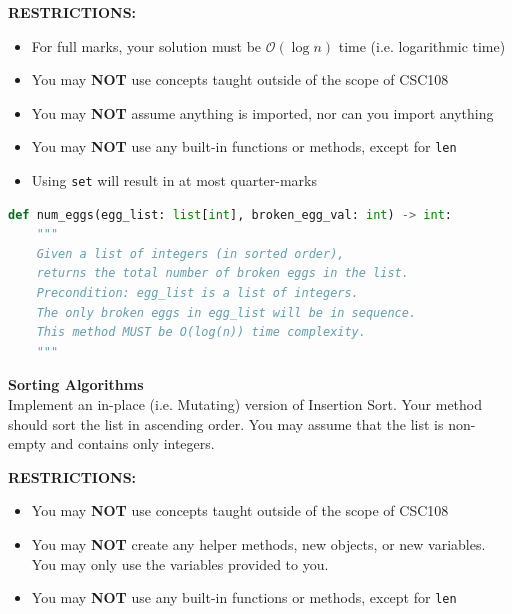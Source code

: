 \documentclass[letterpaper,13pt,addpoints]{exam}
\begin{document}
\begin{questions}
    \begin{center}
        \textbf{RESTRICTIONS:}
        \begin{itemize}
            \item For full marks, your solution must be $\mathcal{O}(\log n)$ time (i.e.
                  logarithmic time)
            \item You may \textbf{NOT} use concepts taught outside of the scope of CSC108
            \item You may \textbf{NOT} assume anything is imported, nor can you import anything
            \item You may \textbf{NOT} use any built-in functions or methods, except for
                  \texttt{len}
            \item Using \texttt{set} will result in at most quarter-marks
        \end{itemize}
    \end{center}
    \begin{lstlisting}[language=Python, style=mystyle]
def num_eggs(egg_list: list[int], broken_egg_val: int) -> int:
    """
    Given a list of integers (in sorted order),
    returns the total number of broken eggs in the list.
    Precondition: egg_list is a list of integers.
    The only broken eggs in egg_list will be in sequence.
    This method MUST be O(log(n)) time complexity.
    """
    \end{lstlisting}
    \clearpage
    \question[10] \textbf{Sorting Algorithms} \\
    Implement an in-place (i.e. Mutating) version of Insertion Sort. Your method should sort the list in ascending order. You may assume that the list is non-empty and contains only integers.
    \begin{center}
        \textbf{RESTRICTIONS:}
        \begin{itemize}
            \item You may \textbf{NOT} use concepts taught outside of the scope of CSC108
            \item You may \textbf{NOT} create any helper methods, new objects, or new variables.
                  You may only use the variables provided to you.
            \item You may \textbf{NOT} use any built-in functions or methods, except for
                  \texttt{len}
        \end{itemize}
    \end{center}
    \begin{lstlisting}[language=Python, style=mystyle]

\end{lstlisting}
\end{questions}
\end{document}
